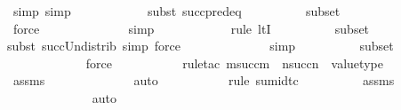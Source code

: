 \begin{isabellebody}
\ {\isacharparenleft}{\kern0pt}simp{\isacharcomma}{\kern0pt}\ simp{\isacharparenright}{\kern0pt}\isanewline
\ \ \ \ \ \ \ \ \ \ \ \isamarkupfalse%
{\isacharparenleft}{\kern0pt}subst\ succ{\isacharunderscore}{\kern0pt}pred{\isacharunderscore}{\kern0pt}eq{\isacharparenright}{\kern0pt}\isanewline
\ \ \ \ \ \ \ \ \isamarkupfalse%
\ {\isasymDelta}{}{\isacharunderscore}{\kern0pt}subset\isanewline
\ \ \ \ \ \ \ \ \ \ \ \ \ \isamarkupfalse%
\ force\isanewline
\ \ \ \ \ \ \ \ \ \ \ \ \isamarkupfalse%
\ simp\isanewline
\ \ \ \ \ \ \ \ \ \ \ \isamarkupfalse%
{\isacharparenleft}{\kern0pt}rule\ ltI{\isacharparenright}{\kern0pt}\isanewline
\ \ \ \ \ \ \ \ \isamarkupfalse%
\ {\isasymDelta}{}{\isacharunderscore}{\kern0pt}subset\isanewline
\ \ \ \ \ \ \ \ \ \ \ \ \isamarkupfalse%
{\isacharparenleft}{\kern0pt}subst\ succ{\isacharunderscore}{\kern0pt}Un{\isacharunderscore}{\kern0pt}distrib{\isacharcomma}{\kern0pt}\ simp{\isacharcomma}{\kern0pt}\ force{\isacharparenright}{\kern0pt}{\isacharplus}{\kern0pt}\isanewline
\ \ \ \ \ \ \ \ \ \ \ \ \isamarkupfalse%
\ simp\isanewline
\ \ \ \ \ \ \ \ \isamarkupfalse%
\ {\isasymDelta}{}{\isacharunderscore}{\kern0pt}subset\isanewline
\ \ \ \ \ \ \ \ \ \ \ \isamarkupfalse%
\ force\isanewline
\ \ \ \ \ \ \ \ \ \ \isamarkupfalse%
{\isacharparenleft}{\kern0pt}rule{\isacharunderscore}{\kern0pt}tac\ m{\isacharequal}{\kern0pt}{\isachardoublequoteopen}succ{\isacharparenleft}{\kern0pt}m{\isacharparenright}{\kern0pt}{\isachardoublequoteclose}\ \ n{\isacharequal}{\kern0pt}{\isachardoublequoteopen}succ{\isacharparenleft}{\kern0pt}n{\isacharparenright}{\kern0pt}{\isachardoublequoteclose}\ \ value{\isacharunderscore}{\kern0pt}type{\isacharparenright}{\kern0pt}\isanewline
\ \ \ \ \ \ \ \ \isamarkupfalse%
\ assms{}\isanewline
\ \ \ \ \ \ \ \ \ \ \ \ \isamarkupfalse%
\ auto{\isacharbrackleft}{\kern0pt}{}{\isacharbrackright}{\kern0pt}\isanewline
\ \ \ \ \ \ \ \ \ \ \isamarkupfalse%
{\isacharparenleft}{\kern0pt}rule\ sum{\isacharunderscore}{\kern0pt}id{\isacharunderscore}{\kern0pt}tc{\isacharparenright}{\kern0pt}\isanewline
\ \ \ \ \ \ \ \ \isamarkupfalse%
\ assms{}\isanewline
\ \ \ \ \ \ \ \ \ \ \ \ \isamarkupfalse%
\ auto{\isacharbrackleft}{\kern0pt}{}{\isacharbrackright}{\kern0pt}\isanewline

\end{isabellebody}
